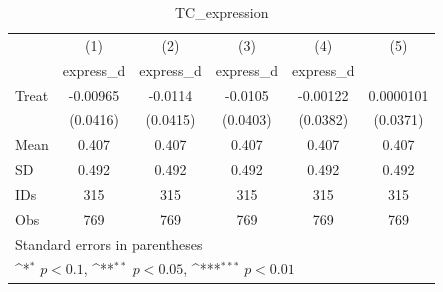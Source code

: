 \begin{table}[htbp]\centering
\def\sym#1{\ifmmode^{#1}\else\(^{#1}\)\fi}
\caption{TC\_expression}
\begin{tabular}{l*{5}{c}}
\hline\hline
                                &\multicolumn{1}{c}{(1)}&\multicolumn{1}{c}{(2)}&\multicolumn{1}{c}{(3)}&\multicolumn{1}{c}{(4)}&\multicolumn{1}{c}{(5)}\\
                                &\multicolumn{1}{c}{express\_d}&\multicolumn{1}{c}{express\_d}&\multicolumn{1}{c}{express\_d}&\multicolumn{1}{c}{express\_d}&\multicolumn{1}{c}{}\\
\hline
Treat                           & -0.00965         &  -0.0114         &  -0.0105         & -0.00122         &0.0000101         \\
                                & (0.0416)         & (0.0415)         & (0.0403)         & (0.0382)         & (0.0371)         \\
\hline
Mean                            &    0.407         &    0.407         &    0.407         &    0.407         &    0.407         \\
SD                              &    0.492         &    0.492         &    0.492         &    0.492         &    0.492         \\
IDs                             &      315         &      315         &      315         &      315         &      315         \\
Obs                             &      769         &      769         &      769         &      769         &      769         \\
\hline\hline
\multicolumn{6}{l}{\footnotesize Standard errors in parentheses}\\
\multicolumn{6}{l}{\footnotesize \sym{*} \(p<0.1\), \sym{**} \(p<0.05\), \sym{***} \(p<0.01\)}\\
\end{tabular}
\end{table}
